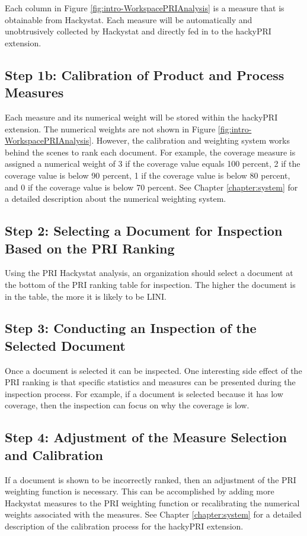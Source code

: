 Each column in Figure \ref{fig:intro-WorkspacePRIAnalysis} is a measure
that is obtainable from Hackystat. Each measure will be automatically and
unobtrusively collected by Hackystat and directly fed in to the hackyPRI
extension.


\subsection{Step 1b: Calibration of Product and Process Measures}
Each measure and its numerical weight will be stored within the hackyPRI
extension. The numerical weights are not shown in Figure
\ref{fig:intro-WorkspacePRIAnalysis}. However, the calibration and
weighting system works behind the scenes to rank each document. For
example, the coverage measure is assigned a numerical weight of 3 if the
coverage value equals 100 percent, 2 if the coverage value is below 90
percent, 1 if the coverage value is below 80 percent, and 0 if the coverage
value is below 70 percent. See Chapter \ref{chapter:system} for a detailed
description about the numerical weighting system.


\subsection{Step 2: Selecting a Document for Inspection Based on the PRI
  Ranking} Using the PRI Hackystat analysis, an organization should
select a document at the bottom of the PRI ranking table for inspection.
The higher the document is in the table, the more it is likely to be LINI.


\subsection{Step 3: Conducting an Inspection of the Selected Document}
Once a document is selected it can be inspected. One interesting side
effect of the PRI ranking is that specific statistics and measures
can be presented during the inspection process. For example, if a document
is selected because it has low coverage, then the inspection can focus on
why the coverage is low.

\subsection{Step 4: Adjustment of the Measure Selection and Calibration}
If a document is shown to be incorrectly ranked, then an adjustment of the
PRI weighting function is necessary. This can be accomplished by adding
more Hackystat measures to the PRI weighting function or recalibrating the
numerical weights associated with the measures. See Chapter
\ref{chapter:system} for a detailed description of the calibration process
for the hackyPRI extension.



